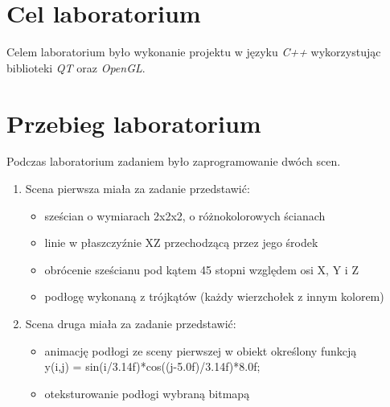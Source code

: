 \documentclass{article}
\begin{document}

\newpage
\section{Cel laboratorium}
Celem laboratorium było wykonanie projektu w języku \emph{C++} wykorzystując biblioteki \emph{QT} oraz \emph{OpenGL}.
\section{Przebieg laboratorium}
Podczas laboratorium zadaniem było zaprogramowanie dwóch scen.
\begin{enumerate}
\item Scena pierwsza miała za zadanie przedstawić:
\begin{itemize}
\item sześcian o wymiarach 2x2x2, o różnokolorowych ścianach
\item linie w płaszczyźnie XZ przechodzącą przez jego środek
\item obrócenie sześcianu pod kątem 45 stopni względem osi X, Y i Z
\item podłogę wykonaną z trójkątów (każdy wierzchołek z innym kolorem)
\end{itemize}
\item Scena druga miała za zadanie przedstawić:
\begin{itemize}
\item animację podłogi ze sceny pierwszej w obiekt określony funkcją\\ \textsf{y(i,j) = sin(i/3.14f)*cos((j-5.0f)/3.14f)*8.0f;}
\item oteksturowanie podłogi wybraną bitmapą
\end{itemize}
\end{enumerate}
\end{document}
